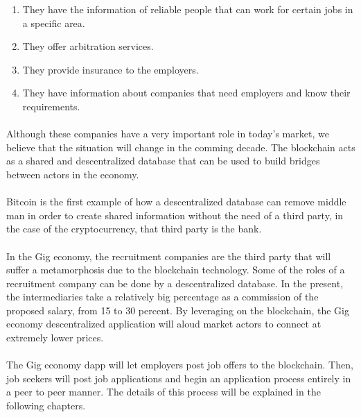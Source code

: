 \documentclass{article}
\begin{document}
\begin{enumerate}
  \item They have the information of reliable people that can work for certain jobs in a specific area.
  \item They offer arbitration services.
  \item They provide insurance to the employers.
  \item They have information about companies that need employers and know their requirements.

\end{enumerate}

\paragraph{} Although these companies have a very important role in today's market, we believe that the situation will change in the comming decade. The blockchain acts as a shared and descentralized database that can be used to build bridges between actors in the economy.

\paragraph{} Bitcoin is the first example of how a descentralized database can remove middle man in order to create shared information without the need of a third party, in the case of the cryptocurrency, that third party is the bank.

\paragraph{} In the Gig economy, the recruitment companies are the third party that will suffer a metamorphosis due to the blockchain technology. Some of the roles of a recruitment company can be done by a descentralized database. In the present, the intermediaries take a relatively big percentage as a commission of the proposed salary, from 15 to 30 percent. By leveraging on the blockchain, the Gig economy descentralized application will aloud market actors to connect at extremely lower prices.

\paragraph{} The Gig economy dapp will let employers post job offers to the blockchain. Then, job seekers will post job applications and begin an application process entirely in a peer to peer manner. The details of this process will be explained in the following chapters.
\end{document}
